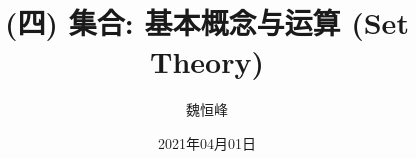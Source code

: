 \documentclass[]{beamer}
\title[(四) 集合 (Set Theory)]{(四) 集合: 基本概念与运算 (Set Theory)}
\author[魏恒峰]{\large 魏恒峰}
\institute{hfwei@nju.edu.cn}
\date{2021年04月01日}
\begin{document}
\maketitle





\thankyou{}

\end{document}

